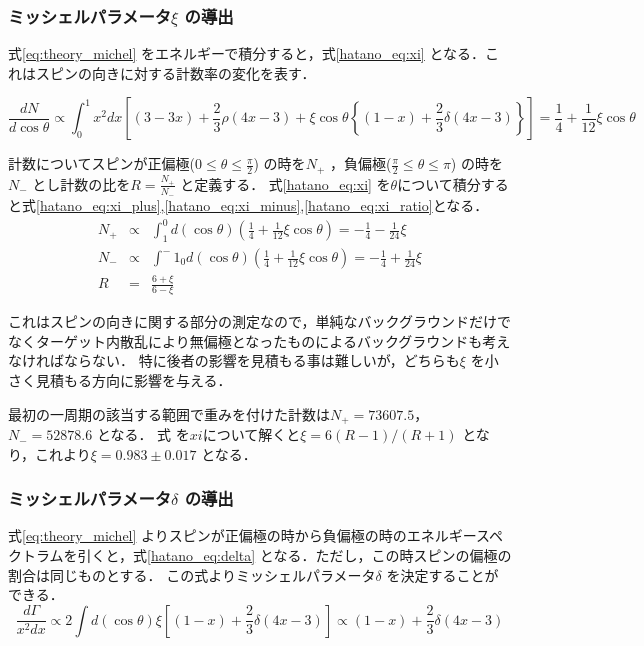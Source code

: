 \subsubsection{ミッシェルパラメータ$\xi$ の導出}
式\eqref{eq:theory_michel} をエネルギーで積分すると，式\eqref{hatano_eq:xi} となる．これはスピンの向きに対する計数率の変化を表す．

\begin{equation}
  \frac{dN}{d\cos\theta} \propto \int^1_0 x^2dx\left[ (3-3x) + \frac{2}{3}\rho(4x-3) + \xi\cos\theta\left\{ (1-x) + \frac{2}{3}\delta(4x-3) \right\}\right] = \frac{1}{4} + \frac{1}{12}\xi\cos\theta
  \label{hatano_eq:xi}
\end{equation}

計数についてスピンが正偏極($0\leq\theta\leq\frac{\pi}{2}$) の時を$N_+$ ，負偏極($\frac{\pi}{2}\leq\theta\leq\pi$) の時を$N_-$ とし計数の比を$R=\frac{N_+}{N_-}$ と定義する．
式\eqref{hatano_eq:xi} を$\theta$について積分すると式\eqref{hatano_eq:xi_plus},\eqref{hatano_eq:xi_minus},\eqref{hatano_eq:xi_ratio}となる．
\begin{eqnarray}
  N_+ & \propto & \int^0_1 d(\cos\theta) \left(\frac{1}{4} + \frac{1}{12}\xi\cos\theta\right)=-\frac{1}{4}-\frac{1}{24}\xi \label{hatano_eq:xi_plus} \\
  N_- & \propto & \int^-1_0 d(\cos\theta) \left(\frac{1}{4} + \frac{1}{12}\xi\cos\theta\right)=-\frac{1}{4}+\frac{1}{24}\xi \label{hatano_eq:xi_minus} \\
  R  & = & \frac{6+\xi}{6-\xi} \label{hatano_eq:xi_ratio}
\end{eqnarray}

これはスピンの向きに関する部分の測定なので，単純なバックグラウンドだけでなくターゲット内散乱により無偏極となったものによるバックグラウンドも考えなければならない．
特に後者の影響を見積もる事は難しいが，どちらも$\xi$ を小さく見積もる方向に影響を与える．

最初の一周期の該当する範囲で重みを付けた計数は$N_+=73607.5$，$N_-=52878.6$ となる．
式\label{hatano_eq:xi_ratio} を$xi$について解くと$\xi=6(R-1) / (R+1)$ となり，これより$\xi=0.983\pm0.017$ となる．

\subsubsection{ミッシェルパラメータ$\delta$ の導出}
式\eqref{eq:theory_michel} よりスピンが正偏極の時から負偏極の時のエネルギースペクトラムを引くと，式\eqref{hatano_eq:delta} となる．ただし，この時スピンの偏極の割合は同じものとする．
この式よりミッシェルパラメータ$\delta$ を決定することができる．
\begin{equation}
  \frac{d\Gamma}{x^2dx} \propto 2 \int d(\cos\theta) \xi \left[ (1-x) + \frac{2}{3}\delta(4x-3) \right] \propto (1-x) + \frac{2}{3}\delta(4x-3)
  \label{hatano_eq:delta}
\end{equation}

